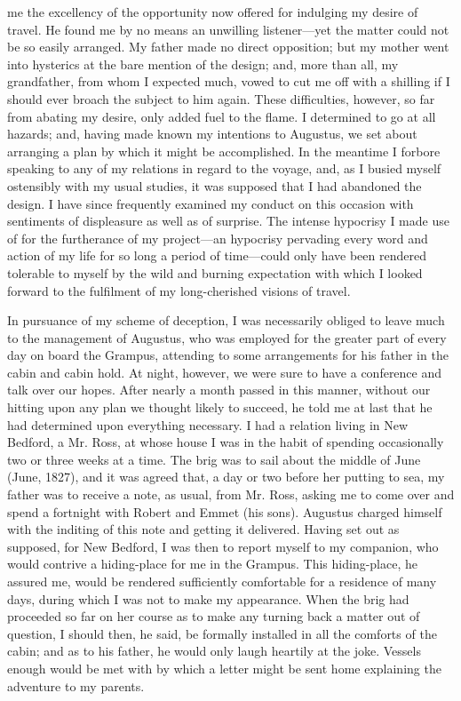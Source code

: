me the excellency of the opportunity now offered for indulging my desire of
travel. He found me by no means an unwilling listener---yet the matter could not
be so easily arranged. My father made no direct opposition; but my mother went
into hysterics at the bare mention of the design; and, more than all, my
grandfather, from whom I expected much, vowed to cut me off with a shilling if I
should ever broach the subject to him again. These difficulties, however, so far
from abating my desire, only added fuel to the flame. I determined to go at all
hazards; and, having made known my intentions to Augustus, we set about
arranging a plan by which it might be accomplished. In the meantime I forbore
speaking to any of my relations in regard to the voyage, and, as I busied myself
ostensibly with my usual studies, it was supposed that I had abandoned the
design. I have since frequently examined my conduct on this occasion with
sentiments of displeasure as well as of surprise. The intense hypocrisy I made
use of for the furtherance of my project---an hypocrisy pervading every word and
action of my life for so long a period of time---could only have been rendered
tolerable to myself by the wild and burning expectation with which I looked
forward to the fulfilment of my long-cherished visions of travel. 

In pursuance of my scheme of deception, I was necessarily obliged to leave
much to the management of Augustus, who was employed for the greater part of
every day on board the Grampus, attending to some arrangements for his father in
the cabin and cabin hold. At night, however, we were sure to have a conference
and talk over our hopes. After nearly a month passed in this manner, without our
hitting upon any plan we thought likely to succeed, he told me at last that he
had determined upon everything necessary. I had a relation living in New
Bedford, a Mr. Ross, at whose house I was in the habit of spending occasionally
two or three weeks at a time. The brig was to sail about the middle of June
(June, 1827), and it was agreed that, a day or two before her putting to sea, my
father was to receive a note, as usual, from Mr. Ross, asking me to come over
and spend a fortnight with Robert and Emmet (his sons). Augustus charged himself
with the inditing of this note and getting it delivered. Having set out as
supposed, for New Bedford, I was then to report myself to my companion, who
would contrive a hiding-place for me in the Grampus. This hiding-place, he
assured me, would be rendered sufficiently comfortable for a residence of many
days, during which I was not to make my appearance. When the brig had proceeded
so far on her course as to make any turning back a matter out of question, I
should then, he said, be formally installed in all the comforts of the cabin;
and as to his father, he would only laugh heartily at the joke. Vessels enough
would be met with by which a letter might be sent home explaining the adventure
to my parents. 

